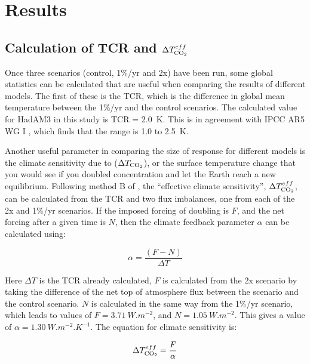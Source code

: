 \documentclass{article}
\begin{document}
\newpage
\section{Results}

\subsection{Calculation of TCR and $\Delta T^{eff}_{\ce{CO2}}$}

Once three scenarios (control, 1\%/yr and 2x) have been run, some global statistics can be calculated that are useful when comparing the results of different models. The first of these is the TCR, which is the difference in global mean temperature between the 1\%/yr and the control scenarios. The calculated value for HadAM3 in this study is TCR = \SI{2.0}{K}. This is in agreement with IPCC AR5 WG I \parencite{ipcc2014wg1}, which finds that the range is 1.0 to \SI{2.5}{K}.

Another useful parameter in comparing the size of response for different models is the climate sensitivity due to  ($\Delta T_{\ce{CO2}}$), or the surface temperature change that you would see if you doubled  concentration and let the Earth reach a new equilibrium. Following method B of \textcite{gregory2004new}, the ``effective climate sensitivity'', $\Delta T^{eff}_{\ce{CO2}}$, can be calculated from the TCR and two flux imbalances, one from each of the 2x and 1\%/yr scenarios. If the imposed forcing of doubling  is $F$, and the net forcing after a given time is $N$, then the climate feedback parameter $\alpha$ can be calculated using:

\begin{equation}
    \alpha = \frac{(F - N)}{\Delta T}
    \label{eqn:alpha}
\end{equation}

Here $\Delta T$ is the TCR already calculated, $F$ is calculated from the 2x scenario by taking the difference of the net top of atmosphere flux between the scenario and the control scenario. $N$ is calculated in the same way from the 1\%/yr scenario, which leads to values of $F = \SI{3.71}{W.m^{-2}}$, and $N = \SI{1.05}{W.m^{-2}}$. This gives a value of $\alpha = \SI{1.30}{W.m^{-2}.K^{-1}}$. The equation for climate sensitivity is:

\begin{equation}
    \Delta T^{eff}_{\ce{CO2}} = \frac{F}{\alpha}
    \label{eqn:delta_t}
\end{equation}
\end{document}

